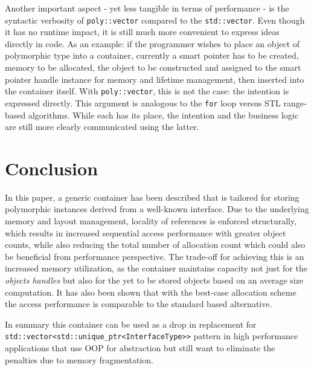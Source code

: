 \documentclass[a4paper,12pt]{article}
\begin{document}
Another important aspect - yet less tangible in terms of performance - is the syntactic verbosity of \lstinline{poly::vector} compared to the \lstinline{std::vector}. Even though it has no runtime impact, it is still much more convenient to express ideas directly in code. As an example: if the programmer wishes to place an object of polymorphic type into a container, currently a smart pointer has to be created, memory to be allocated, the object to be constructed and assigned to the smart pointer handle instance for memory and lifetime management, then inserted into the container itself. With \lstinline{poly::vector}, this is not the case: the intention is expressed directly. This argument is analogous to the \lstinline{for} loop versus STL range-based algorithms. While each has its place, the intention and the business logic are still more clearly communicated using the latter.


\section{Conclusion}
In this paper, a generic container has been described that is tailored for storing polymorphic instances derived from a well-known interface. Due to the underlying memory and layout management, locality of references is enforced structurally, which results in increased sequential access performance with greater object counts, while also reducing the total number of allocation count which could also be beneficial from performance perspective. The trade-off for achieving this is an increased memory utilization, as the container maintains capacity not just for the \emph{objects handles} but also for the yet to be stored objects based on an average size computation. It has also been shown that with the best-case allocation scheme the access performance is comparable to the standard based alternative. 

In summary this container can be used as a drop in replacement for \lstinline{std::vector<std::unique_ptr<InterfaceType>>} pattern in high performance applications that use OOP for abstraction but still want to eliminate the penalties due to memory fragmentation. 



\end{document}
